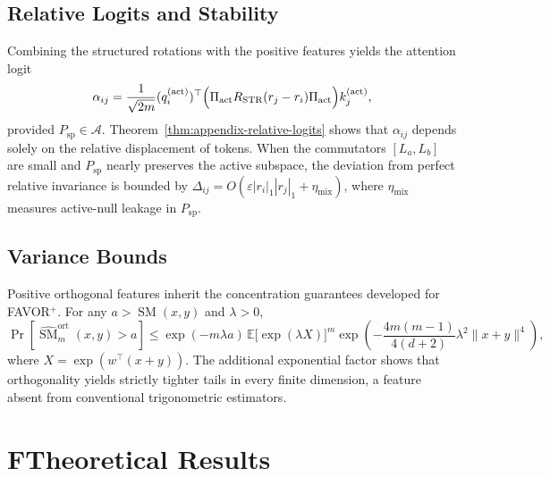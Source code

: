 \documentclass[11pt]{article}
\begin{document}
\subsection{Relative Logits and Stability}

Combining the structured rotations with the positive features yields the attention logit
\[
\alpha_{ij}
= \frac{1}{\sqrt{2m}} (q_i^{(\mathrm{act})})^\top
  \Bigl(\Pi_{\mathrm{act}} R_{\mathrm{STR}}(r_j - r_i) \Pi_{\mathrm{act}}\Bigr)
  k_j^{(\mathrm{act})},
\]
provided $P_{\mathrm{sp}}\in\mathcal{A}$. Theorem~\ref{thm:appendix-relative-logits} shows that $\alpha_{ij}$ depends solely on the
relative displacement of tokens. When the commutators $[L_a,L_b]$ are small and
$P_{\mathrm{sp}}$ nearly preserves the active subspace, the deviation from perfect relative invariance is
bounded by $\Delta_{ij} = O(\varepsilon |r_i|_1 |r_j|_1 + \eta_{\mathrm{mix}})$, where $\eta_{\mathrm{mix}}$ measures
active-null leakage in $P_{\mathrm{sp}}$.

\subsection{Variance Bounds}

Positive orthogonal features inherit the concentration guarantees developed for FAVOR$^+$. For
any $a > \operatorname{SM}(x,y)$ and $\lambda > 0$,
\[
\Pr\!\left[\widehat{\operatorname{SM}}^{\mathrm{ort}}_m(x,y) > a\right]
\le \exp(-m \lambda a) \, \mathbb{E}\big[\exp(\lambda X)\big]^m
\exp\!\left(-\frac{4m(m-1)}{4(d+2)} \lambda^2 \|x+y\|^4\right),
\]
where $X = \exp(w^\top (x+y))$. The additional exponential factor shows that orthogonality yields
strictly tighter tails in every finite dimension, a feature absent from conventional trigonometric
estimators.

\clearpage
\appendix
\section*{F\quad Theoretical Results}
\label{sec:appendix-theory}
\end{document}
